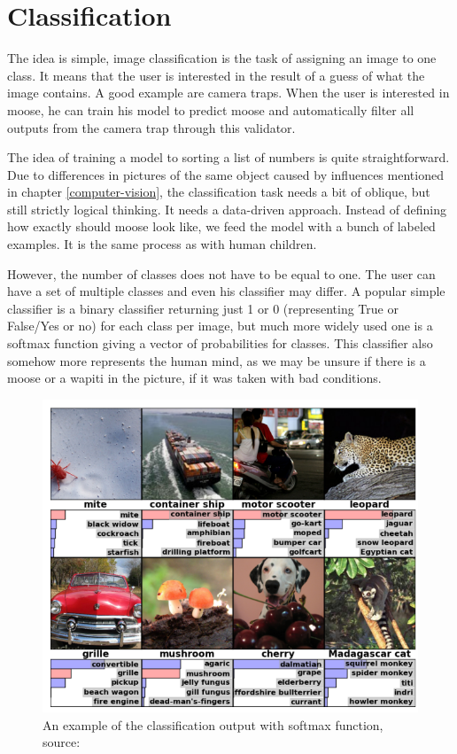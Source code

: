 \section{Classification}
\label{classification}

The idea is simple, image classification is the task of assigning an image to 
one class. It means that the user is interested in the result of a guess of what 
the image contains. A good example are camera traps. When the user is interested 
in moose, he can train his model to predict moose and automatically filter all 
outputs from the camera trap through this validator.

The idea of training a model to sorting a list of numbers is quite 
straightforward. Due to differences in pictures of the same object caused by 
influences mentioned in chapter \ref{computer-vision}, the classification task 
needs a bit of oblique, but still strictly logical thinking. It needs a 
data-driven approach. Instead of defining how exactly should moose look like, we 
feed the model with a bunch of labeled examples. It is the same process as with 
human children.

However, the number of classes does not have to be equal to one. The user can 
have a set of multiple classes and even his classifier may differ. A popular 
simple classifier is a binary classifier returning just 1 or 0 (representing 
True or False/Yes or no) for each class per image, but much more widely used one 
is a softmax function giving a vector of probabilities for classes. This 
classifier also somehow more represents the human mind, as we may be unsure if 
there is a moose or a wapiti in the picture, if it was taken with bad 
conditions.

\begin{figure}[H]
   \centering
	\includegraphics[width=.8\linewidth]{./pictures/classification.png}
	\caption[Classification example]{An example of the classification output with 
softmax function, source: \cite{cnn-classification}}
      \label{fig:class}
\end{figure}

